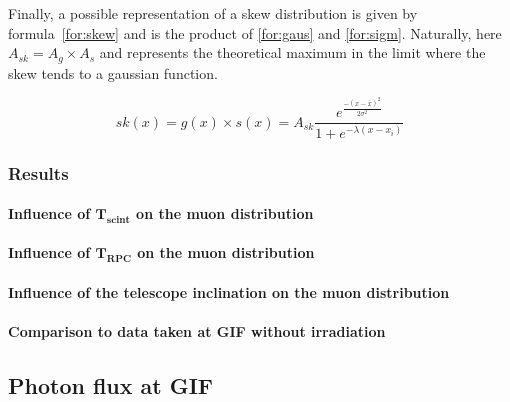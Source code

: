 		Finally, a possible representation of a skew distribution is given by formula~\ref{for:skew} and is the product of \ref{for:gaus} and \ref{for:sigm}. Naturally, here $A_{sk} = A_g \times A_s$ and represents the theoretical maximum in the limit where the skew tends to a gaussian function.
			
			\begin{center}
				\begin{equation}
				\label{for:skew}
					sk(x) = g(x)\times s(x) = A_{sk}\frac{e^{\frac{-(x-\bar{x})^2}{2\sigma^2}}}{1+e^{-\lambda(x-x_i)}}
				\end{equation}
			\end{center}
			
		\subsubsection{Results}
		\label{sssec:SimRes}
			
			\paragraph{Influence of $\mathbf{T_{scint}}$ on the muon distribution}
			
			\paragraph{Influence of $\mathbf{T_{RPC}}$ on the muon distribution}
		
			\paragraph{Influence of the telescope inclination on the muon distribution}
			
			\paragraph{Comparison to data taken at GIF without irradiation}
		
	\subsection{Photon flux at \acs{GIF}}
	\label{ssec:gFlux}
			
